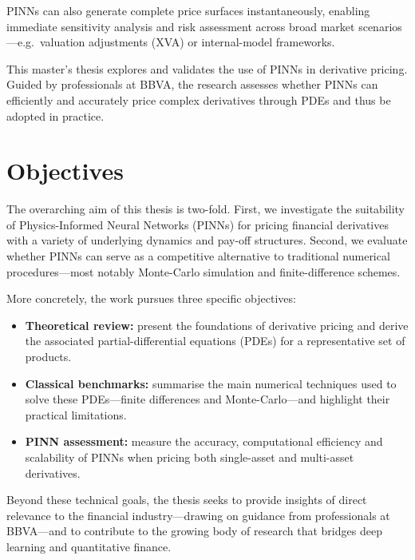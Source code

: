 \documentclass[12pt]{report} %
\theoremstyle{plain}           %
\theoremstyle{definition}      %
\theoremstyle{remark}          %
\begin{document}
PINNs can also generate complete price surfaces instantaneously, enabling immediate sensitivity
analysis and risk assessment across broad market scenarios—e.g.\ valuation adjustments (XVA)
or internal-model frameworks.

This master's thesis explores and validates the use of PINNs in derivative pricing.
Guided by professionals at BBVA, the research assesses whether PINNs can efficiently
and accurately price complex derivatives through PDEs and thus be adopted in practice.


\section{Objectives}

The overarching aim of this thesis is two-fold.  
First, we investigate the suitability of Physics-Informed Neural Networks (PINNs) for pricing
financial derivatives with a variety of underlying dynamics and pay-off structures.
Second, we evaluate whether PINNs can serve as a competitive alternative to traditional
numerical procedures—most notably Monte-Carlo simulation and finite-difference schemes.

More concretely, the work pursues three specific objectives:
\begin{itemize}
  \item \textbf{Theoretical review:} present the foundations of derivative pricing and derive the
        associated partial-differential equations (PDEs) for a representative set of products.
  \item \textbf{Classical benchmarks:} summarise the main numerical techniques used to solve
        these PDEs—finite differences and Monte-Carlo—and highlight their
        practical limitations.
  \item \textbf{PINN assessment:} measure the accuracy, computational efficiency and scalability
        of PINNs when pricing both single-asset and multi-asset derivatives.
\end{itemize}

Beyond these technical goals, the thesis seeks to provide insights of direct relevance to the
financial industry—drawing on guidance from professionals at BBVA—and to contribute to the
growing body of research that bridges deep learning and quantitative finance.
\end{document}
